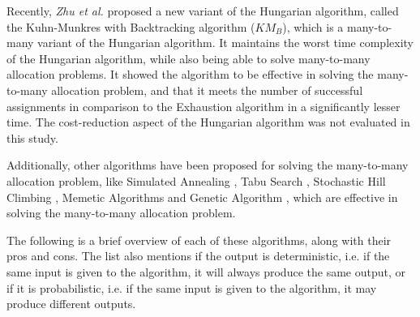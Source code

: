 Recently, \textit{Zhu et al.} \cite{zhu2016solving} proposed a new variant of the Hungarian algorithm, called the Kuhn-Munkres with Backtracking algorithm ($KM_B$), which is a many-to-many variant of the Hungarian algorithm. It maintains the worst time complexity of the Hungarian algorithm, while also being able to solve many-to-many allocation problems. It showed the algorithm to be effective in solving the many-to-many allocation problem, and that it meets the number of successful assignments in comparison to the Exhaustion algorithm in a significantly lesser time. The cost-reduction aspect of the Hungarian algorithm was not evaluated in this study.

Additionally, other algorithms have been proposed for solving the many-to-many allocation problem, like Simulated Annealing \cite{bertsimas1993simulated}, Tabu Search \cite{glover1990tabu}, Stochastic Hill Climbing \cite{juels1995stochastic}, Memetic Algorithms \cite{neri2012memetic} and Genetic Algorithm \cite{lambora2019genetic}, which are effective in solving the many-to-many allocation problem.

The following is a brief overview of each of these algorithms, along with their pros and cons. The list also mentions if the output is deterministic, i.e. if the same input is given to the algorithm, it will always produce the same output, or if it is probabilistic, i.e. if the same input is given to the algorithm, it may produce different outputs.

